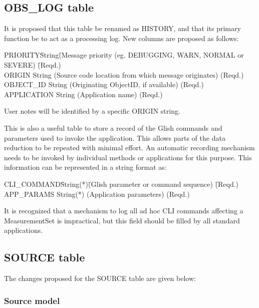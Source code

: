 \documentclass{article}
\begin{document}
\subsection{OBS\_LOG table}

It is proposed that this table be renamed as HISTORY, and that its
primary function be to act as a processing log. New columns
are proposed as follows:

\begin{tabbing}
PRIORITY\quad\quad\quad \= String\quad\quad \= 
(Message priority (eg. DEBUGGING, WARN, NORMAL or SEVERE)
 \quad\quad \= (Reqd.) \\
ORIGIN             \> String  \> 
(Source code location from which message originates) \> (Reqd.) \\
OBJECT\_ID         \> String  \>
(Originating ObjectID, if available) \> (Reqd.) \\
APPLICATION        \> String \>
(Application name) \> (Reqd.) \\
\end{tabbing}

User notes will be identified by a specific ORIGIN string.

This is also a useful table to store a record of the Glish commands
and parameters used to invoke the application. This allows parts of
the data reduction to be repeated with minimal effort. An automatic
recording mechanism needs to be invoked by individual methods or
applications for this purpose. This information can be represented in
a string format as:

\begin{tabbing}
CLI\_COMMAND\quad\quad \= String(*)\quad\quad \= 
(Glish parameter or command sequence)
 \quad\quad \= (Reqd.) \\
APP\_PARAMS \> String(*) \> (Application parameters) \> (Reqd.)
\end{tabbing}

 It is recognized that a mechanism to log all ad hoc CLI commands
affecting a MeasurementSet is impractical, but this field should be
filled by all standard applications.

\subsection{SOURCE table}

The changes proposed for the SOURCE table are given below:

\subsubsection{Source model}
\end{document}
